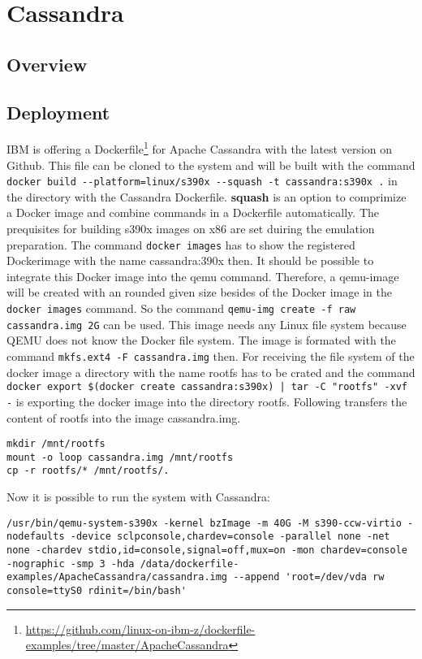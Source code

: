 \chapter{Cassandra}\label{ch:cassandra}

\section{Overview}

\section{Deployment}

IBM is offering a Dockerfile\footnote{\url{https://github.com/linux-on-ibm-z/dockerfile-examples/tree/master/ApacheCassandra}} for Apache Cassandra with the latest version on Github. This file can be cloned to the system and will be built with the command  \lstinline!docker build --platform=linux/s390x --squash -t cassandra:s390x .! in the directory with the Cassandra Dockerfile. \textbf{squash} is an option to comprimize a Docker image and combine commands in a Dockerfile automatically. The prequisites for building s390x images on x86 are set duiring the emulation preparation. The command \lstinline!docker images! has to show the registered Dockerimage with the name cassandra:390x then. It should be possible to integrate this Docker image into the qemu command. Therefore, a qemu-image will be created with an rounded given size besides of the Docker image in the  \lstinline!docker images! command. So the command  \lstinline!qemu-img create -f raw cassandra.img 2G! can be used. This image needs any Linux file system because QEMU does not know the Docker file system. The image is formated with the command  \lstinline!mkfs.ext4 -F cassandra.img! then. For receiving the file system of the docker image a directory with the name rootfs has to be crated and the command
\lstinline!docker export $(docker create cassandra:s390x) | tar -C "rootfs" -xvf -! is exporting the docker image into the directory rootfs. Following transfers the content of rootfs into the image cassandra.img.

\begin{lstlisting}[style=BashInputStyle]
mkdir /mnt/rootfs
mount -o loop cassandra.img /mnt/rootfs
cp -r rootfs/* /mnt/rootfs/.
 \end{lstlisting}

Now it is possible to run the system with Cassandra: \\
\begin{lstlisting}[style=BashInputStyle]
 /usr/bin/qemu-system-s390x -kernel bzImage -m 40G -M s390-ccw-virtio -nodefaults -device sclpconsole,chardev=console -parallel none -net none -chardev stdio,id=console,signal=off,mux=on -mon chardev=console -nographic -smp 3 -hda /data/dockerfile-examples/ApacheCassandra/cassandra.img --append 'root=/dev/vda rw console=ttyS0 rdinit=/bin/bash' 
 \end{lstlisting}
 
